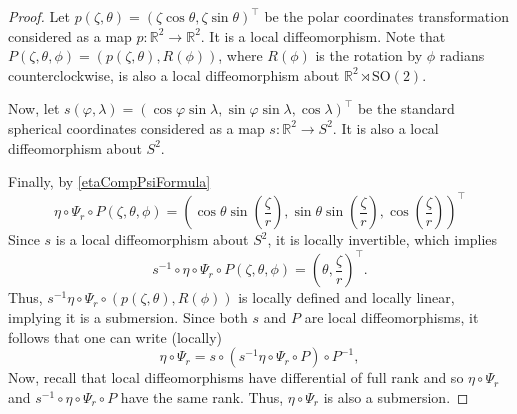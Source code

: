 \documentclass[a4paper,11pt]{scrartcl}
\numberwithin{dummy}{section}
\theoremstyle{plain}
\theoremstyle{plain}
\theoremstyle{plain}
\theoremstyle{plain}
\theoremstyle{nonumberplain}
\newtheorem{proof}{Proof}
\newcommand{\F}[1][R]{\mathbb{#1}} %
\newcommand{\SO}{\mathrm{SO}}
\begin{document}
	\begin{proof}
		Let $ p(\zeta, \theta) = \left(\zeta \cos \theta, \zeta \sin \theta  \right)^{\top} $ be the polar coordinates transformation considered as a map $ p : \F^{2} \to \F^{2} $. It is a local diffeomorphism. Note that $ P (\zeta, \theta, \phi) = \left( p(\zeta, \theta), R(\phi) \right) $, where $ R (\phi) $ is the rotation by $ \phi $ radians counterclockwise, is also a local diffeomorphism about $ \F^{2} \rtimes \SO(2) $. 
		
		Now, let $ s(\varphi, \lambda ) = \left( \cos \varphi \sin \lambda , \sin \varphi \sin \lambda , \cos \lambda \right)^{\top} $ be the standard spherical coordinates considered as a map $ s : \F^{2} \to S^{2} $. It is also a local diffeomorphism about $ S^{2} $.
		
		Finally, by \cref{etaCompPsiFormula}
		\begin{equation*}
			\eta \circ \Psi_{r} \circ P (\zeta, \theta, \phi)
			= \left( \cos \theta \sin \left( \frac{\zeta}{r} \right),  \sin \theta \sin \left( \frac{\zeta}{r} \right), \cos \left( \frac{\zeta}{r} \right) \right)^{\top}
		\end{equation*}
		Since $ s $ is a local diffeomorphism about $ S^{2} $, it is locally invertible, which implies
		\begin{equation*}
			s^{-1 } \circ \eta \circ \Psi_{r} \circ P (\zeta, \theta, \phi )
			= \left( \theta, \frac{\zeta}{r} \right)^{\top}.
		\end{equation*}
		Thus, $ s^{-1 } \eta \circ \Psi_{r} \circ \left(p (\zeta, \theta), R (\phi ) \right) $ is locally defined and locally linear, implying it is a submersion. Since both $ s $ and $ P $ are local diffeomorphisms, it follows that one can write (locally)
		\begin{equation*}
			\eta \circ \Psi_{r}
			= s \circ (s^{-1 } \eta \circ \Psi_{r} \circ P ) \circ P^{-1},
		\end{equation*}
		Now, recall that local diffeomorphisms have differential of full rank and so $ \eta \circ \Psi_{r} $  and $ s^{-1 } \circ \eta \circ \Psi_{r} \circ P  $ have the same rank. Thus, $ \eta \circ \Psi_{r} $ is also a submersion.
	\end{proof}
	
\end{document}
